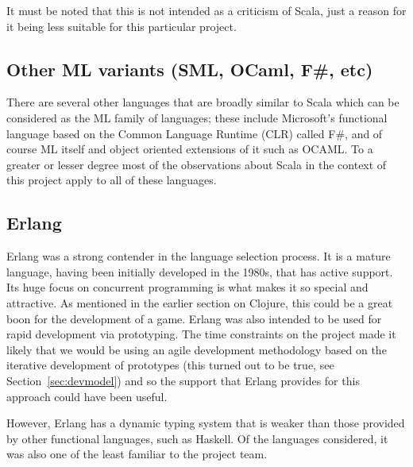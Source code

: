 It must be noted that this is not intended as a criticism of Scala, just a reason for it being less suitable for this particular project.


\subsection{Other ML variants (SML, OCaml, F\#, etc)}


There are several other languages that are broadly similar to Scala which can be considered as the ML family of languages; these include Microsoft's functional language based on the Common Language Runtime (CLR) called F\#, and of course ML itself and object oriented extensions of it such as OCAML. To a greater or lesser degree most of the observations about Scala in the context of this project apply to all of these languages.

\subsection{Erlang}



Erlang was a strong contender in the language selection process. It is a mature language, having been initially developed in the 1980s, that has active support. Its huge focus on concurrent programming is what makes it so special and attractive. As mentioned in the earlier section on Clojure, this could be a great boon for the development of a game. Erlang was also intended to be used for rapid development via prototyping. The time constraints on the project made it likely that we would be using an agile development methodology based on the iterative development of prototypes (this turned out to be true, see Section~\ref{sec:devmodel}) and so the support that Erlang provides for this approach could have been useful.

However, Erlang has a dynamic typing system that is weaker than those provided by other functional languages, such as Haskell. Of the languages considered, it was also one of the least familiar to the project team.


